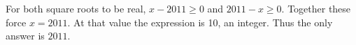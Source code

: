 For both square roots to be real, $x-2011\ge 0$ and $2011-x\ge 0$. Together these force $x=2011$. At that value the expression is 10, an integer. Thus the only answer is $\boxed{2011}$.
